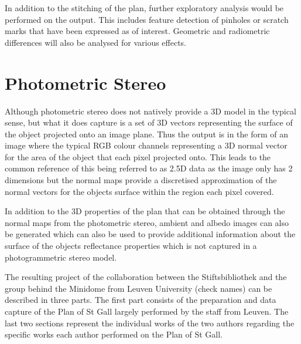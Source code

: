 In addition to the stitching of the plan, further exploratory analysis would be performed on the output. This includes feature detection of pinholes or scratch marks that have been expressed as of interest. Geometric and radiometric differences will also be analysed for various effects.

\section{Photometric Stereo}
Although photometric stereo does not natively provide a 3D model in the typical sense, but what it does capture is a set of 3D vectors representing the surface of the object projected onto an image plane. Thus the output is in the form of an image where the typical RGB colour channels representing a 3D normal vector for the area of the object that each pixel projected onto. This leads to the common reference of this being referred to as 2.5D data as the image only has 2 dimensions but the normal maps provide a discretised approximation of the normal vectors for the objects surface within the region each pixel covered. 

In addition to the 3D properties of the plan that can be obtained through the normal maps from the photometric stereo, ambient and albedo images can also be generated which can also be used to provide additional information about the surface of the objects reflectance properties which is not captured in a photogrammetric stereo model. 

The resulting project of the collaboration between the Stiftsbibliothek and the group behind the Minidome from Leuven University (check names) can be described in three parts. The first part consists of the preparation and data capture of the Plan of St Gall largely performed by the staff from Leuven. The last two sections represent the individual works of the two authors regarding the specific works each author performed on the Plan of St Gall.

